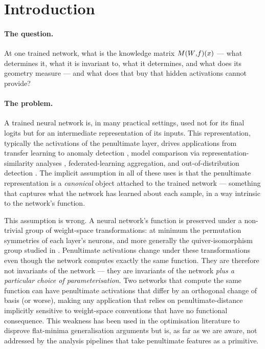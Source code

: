 \section{Introduction}
\label{sec:introduction}

\paragraph{The question.}
At one trained network, what is the knowledge matrix $M(W{,}f)(x)$ --- what
determines it, what it is invariant to, what it determines, and what does
its geometry measure --- and what does that buy that hidden activations
cannot provide?

\paragraph{The problem.}
A trained neural network is, in many practical settings, used not for
its final logits but for an intermediate representation of its
inputs. This representation, typically the activations of the
penultimate layer, drives applications from transfer learning to
anomaly detection \citep{reiss2022anomaly,roth2022towards}, model
comparison via representation-similarity analyses
\citep{kornblith2019similarity}, federated-learning aggregation, and
out-of-distribution detection \citep{lee2018simple,papernot2018deep}.
The implicit assumption in all of these uses is that the penultimate
representation is a \emph{canonical} object attached to the trained
network --- something that captures what the network has learned
about each sample, in a way intrinsic to the network's function.

This assumption is wrong. A neural network's function is preserved
under a non-trivial group of weight-space transformations: at minimum
the permutation symmetries of each layer's neurons, and more
generally the quiver-isomorphism group studied in
\citet{armenta2021representation,armenta2022double}. Penultimate
activations change under these transformations even though the
network computes exactly the same function. They are therefore not
invariants of the network --- they are invariants of the network
\emph{plus a particular choice of parameterisation}. Two networks
that compute the same function can have penultimate activations that
differ by an orthogonal change of basis (or worse), making any
application that relies on penultimate-distance implicitly sensitive
to weight-space conventions that have no functional consequence. This
weakness has been used in the optimisation literature to disprove
flat-minima generalisation arguments \citep{dinh2017sharp} but is, as
far as we are aware, not addressed by the analysis pipelines that
take penultimate features as a primitive.

